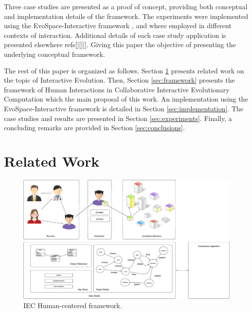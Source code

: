 Three case studies are presented as a proof of concept, providing both
conceptual and implementation details of the framework. 
The experiments were implemented using the EvoSpace-Interactive framework \cite{garcia2013evospace}, 
and where employed in different contexts of interaction. 
Additional details of each case study application is presented elsewhere refs[][][]. 
Giving this paper the objective of presenting the underlying conceptual framework.     

The rest of this paper is organized as follows.
Section \ref{sec:related} presents related work on the topic 
of Interactive Evolution.
Then, Section \ref{sec:framework} presents the framework of Human Interactions in Collaborative Interactive 
 Evolutionary Computation which 
the main proposal of this work. An implementation using the EvoSpace-Interactive  framework is detailed in Section \ref{sec:implementation}.
The case studies  and results are presented in Section \ref{sec:experiments}.
Finally, a concluding remarks are provided in Section \ref{sec:conclusions}.

\section{Related Work}
\label{sec:related}

\begin{figure}[!t]
    \centering
        \includegraphics[width=4.5in]{img/framework.eps}
    \caption{IEC Human-centered framework.}
    \label{fig:uc_framework}
\end{figure}

